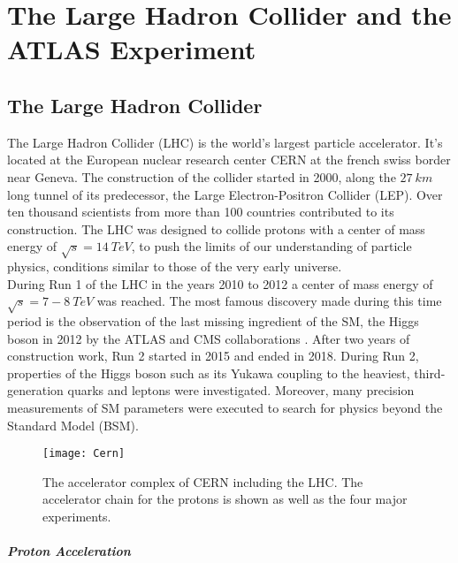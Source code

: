 \chapter{The Large Hadron Collider and the ATLAS Experiment}
\label{sec:ATLAS}

\section{The Large Hadron Collider}
\label{sec:LHC}
The Large Hadron Collider (LHC) is the world's largest particle accelerator. It's located at the European nuclear research center CERN at the french swiss border near Geneva. The construction of the collider started in 2000, along the $\SI{27}{km}$ long tunnel of its predecessor, the Large Electron-Positron Collider (LEP). Over ten thousand scientists from more than 100 countries contributed to its construction. The LHC was designed to collide protons with a center of mass energy of $\sqrt{s}= \SI{14}{TeV}$, to push the limits of our understanding of particle physics, conditions similar to those of the very early universe. \\
During Run 1 of the LHC in the years 2010 to 2012 a center of mass energy of $\sqrt{s}= 7-\SI{8}{TeV}$ was reached. The most famous discovery made during this time period is the observation of the last missing ingredient of the SM, the Higgs boson in 2012 by the ATLAS and CMS collaborations \cite{Higgs}. After two years of construction work, Run 2 started in 2015 and ended in 2018. During Run 2, properties of the Higgs boson such as its Yukawa coupling to the heaviest, third-generation quarks and leptons were investigated. Moreover, many precision measurements of SM parameters were executed to search for physics beyond the Standard Model (BSM). \\


\begin{figure}[H]
\centering
\texttt{[image: Cern]}
\caption{The accelerator complex of CERN including the LHC. The accelerator chain for the protons is shown as well as the four major experiments.\cite{CernAcc}}
\label{fig:Cern}
\end{figure}

\newpage

\paragraph{Proton Acceleration} \mbox{} \\

